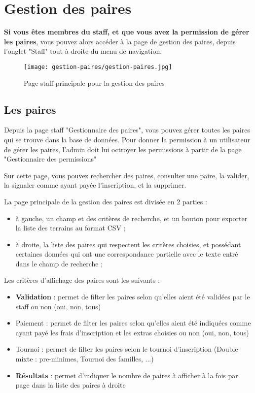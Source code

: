 \section{Gestion des paires}

\textbf{Si vous êtes membres du staff, et que vous avez la permission de gérer les paires}, vous pouvez alors accéder à la page de gestion des paires, depuis l'onglet "Staff" tout à droite du menu de navigation.

\begin{figure}[H]
\centering
\texttt{[image: gestion-paires/gestion-paires.jpg]}
\caption{Page staff principale pour la gestion des paires}
\end{figure}

\subsection{Les paires}

Depuis la page staff "Gestionnaire des paires", vous pouvez gérer toutes les paires qui se trouve dans la base de données. Pour donner la permission à un utilisateur de gérer les paires, l'admin doit lui octroyer les permissions à partir de la page "Gestionnaire des permissions"

\bigskip

Sur cette page, vous pouvez rechercher des paires, consulter une paire, la valider, la signaler comme ayant payée l'inscription, et la supprimer.\newline

La page principale de la gestion des paires est divisée en 2 parties :

\begin{itemize}
\item  à gauche, un champ et des critères de recherche, et un bouton pour exporter la liste des terrains au format CSV ;
\item à droite, la liste des paires qui respectent les critères choisies, et possédant certaines données qui ont une correspondance partielle avec le texte entré dans le champ de recherche ;
\end{itemize}
\bigskip

Les critères d'affichage des paires sont les suivants :

\begin{itemize}
\item \textbf{Validation} : permet de filter les paires selon qu'elles aient été validées par le staff ou non (oui, non, tous)
\item Paiement : permet de filter les paires selon qu'elles aient été indiquées comme ayant payé les frais d'inscription et les extras choisies ou non (oui, non, tous)
\item Tournoi : permet de filter les paires selon le tournoi d'inscription (Double mixte : pre-minimes, Tournoi des familles, ...)
\item \textbf{Résultats} : permet d'indiquer le nombre de paires à afficher à la fois par page dans la liste des paires à droite
\end{itemize}
\bigskip

